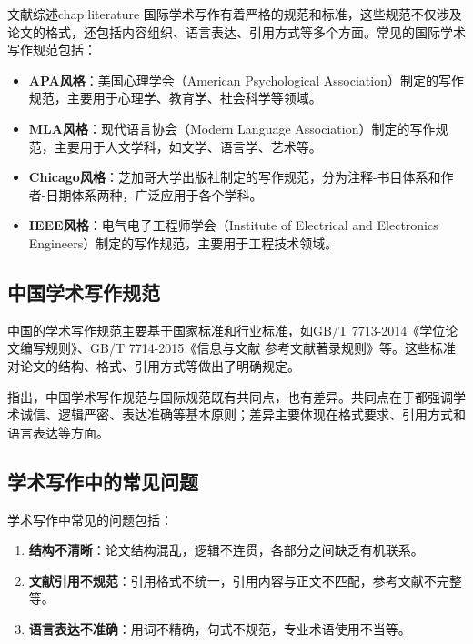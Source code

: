 \begin{cuzchapter}{文献综述}{chap:literature}
	国际学术写作有着严格的规范和标准，这些规范不仅涉及论文的格式，还包括内容组织、语言表达、引用方式等多个方面。常见的国际学术写作规范包括：
	
	\begin{itemize}
		\item \textbf{APA风格}：美国心理学会（American Psychological Association）制定的写作规范，主要用于心理学、教育学、社会科学等领域。
		
		\item \textbf{MLA风格}：现代语言协会（Modern Language Association）制定的写作规范，主要用于人文学科，如文学、语言学、艺术等。
		
		\item \textbf{Chicago风格}：芝加哥大学出版社制定的写作规范，分为注释-书目体系和作者-日期体系两种，广泛应用于各个学科。
		
		\item \textbf{IEEE风格}：电气电子工程师学会（Institute of Electrical and Electronics Engineers）制定的写作规范，主要用于工程技术领域。
	\end{itemize}
	
	\subsection{中国学术写作规范}
	
	中国的学术写作规范主要基于国家标准和行业标准，如GB/T 7713-2014《学位论文编写规则》、GB/T 7714-2015《信息与文献 参考文献著录规则》等。这些标准对论文的结构、格式、引用方式等做出了明确规定。
	
	\citet{chu2004tushu}指出，中国学术写作规范与国际规范既有共同点，也有差异。共同点在于都强调学术诚信、逻辑严密、表达准确等基本原则；差异主要体现在格式要求、引用方式和语言表达等方面。
	
	\subsection{学术写作中的常见问题}
	
	学术写作中常见的问题包括：
	
	\begin{enumerate}
		\item \textbf{结构不清晰}：论文结构混乱，逻辑不连贯，各部分之间缺乏有机联系。
		
		\item \textbf{文献引用不规范}：引用格式不统一，引用内容与正文不匹配，参考文献不完整等。
		
		\item \textbf{语言表达不准确}：用词不精确，句式不规范，专业术语使用不当等。
		

\end{enumerate}
\end{cuzchapter}
